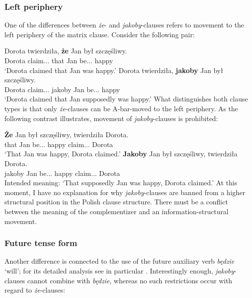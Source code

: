 \documentclass[output=paper
,modfonts
,nonflat]{langsci/langscibook}
\begin{document}
\subsubsection{Left periphery}
One of the differences between \emph{że}- and \emph{jakoby}-clauses refers to movement to the left periphery of the matrix clause. Consider the following pair:

\ea \ea \gll	Dorota twierdziła, \textbf{że} Jan był szczęśliwy. \\  
		Dorota claim.{\lptcp}.{\sg}.{\fem} that Jan be.{\lptcp}.{\sg}.{\masc} happy \\
		\glt`Dorota claimed that Jan was happy.' 
		\ex\gll		Dorota twierdziła, \textbf{jakoby} Jan był szczęśliwy. \\  
			Dorota claim.{\lptcp}.{\sg}.{\fem} jakoby Jan be.{\lptcp}.{\sg}.{\masc} happy \\
		\glt`Dorota claimed that Jan supposedly was happy.'
\z\z
What distinguishes both clause types is that only \emph{że}-clauses can be A-bar-moved to the left periphery. As the following contrast illustrates, movement of \emph{jakoby}-clauses is prohibited:

\ea \ea \gll	\textbf{Że} Jan był szczęśliwy, twierdziła Dorota. \\  
		 that Jan be.{\lptcp}.{\sg}.{\masc} happy  claim.{\lptcp}.{\sg}.{\fem} Dorota \\
    \glt`That Jan was happy, Dorota claimed.' 
	\ex\gll		*\textbf{Jakoby} Jan był szczęśliwy, twierdziła Dorota. \\  
		 jakoby Jan be.{\lptcp}.{\sg}.{\masc} happy  claim.{\lptcp}.{\sg}.{\fem} Dorota \\
	\glt Intended meaning: `That supposedly Jan was happy, Dorota claimed.' 
    \z\z
At this moment, I have no explanation for why \emph{jakoby}-clauses are banned from a higher structural position in the Polish clause structure. There must be a conflict between the meaning of the complementizer and an information-structural movement.

\subsubsection{Future tense form}
Another difference is connected to the use of the future auxiliary verb \emph{będzie} `will'; for its detailed analysis see in particular \textcite{Baszczak-Jabonskaetal2014}. Interestingly enough, \emph{jakoby}-clauses cannot combine with \emph{będzie}, whereas no such restrictions occur with regard to \emph{że}-clauses:
\end{document}
